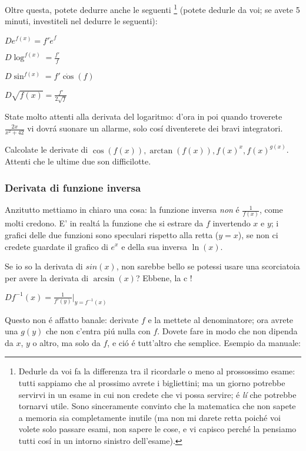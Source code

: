Oltre questa, potete dedurre anche le seguenti \footnote{Dedurle da voi fa la differenza tra il ricordarle o meno al prossossimo esame:
tutti sappiamo che al prossimo avrete i bigliettini; ma un giorno potrebbe servirvi in un esame in cui non credete che vi possa servire;
\'e {\em l\'i} che potrebbe tornarvi utile. Sono sinceramente convinto che la matematica che non sapete a memoria sia completamente inutile
(ma non mi darete retta poich\'e voi volete solo passare esami, non sapere le cose, e vi capisco perch\'e la pensiamo tutti cos\'i in un
intorno sinistro dell'esame).} (potete dedurle da voi; se avete 5 minuti, investiteli nel dedurre le seguenti):

$D e^{f(x)} = f' \dot e^f$

$D \log^{f(x)} = \frac{f'}{f} $

$D \sin^{f(x)} = f' \dot \cos(f)$

$D \sqrt{f(x)} = \frac{f'}{2\sqrt{f}}$

State molto attenti alla derivata del logaritmo: d'ora in poi quando troverete $\frac{2x}{x^2+42}$ vi
dovr\'a suonare un allarme, solo cos\'i diventerete dei bravi integratori.

\begin{esercizio}
Calcolate le derivate di $\cos(f(x)),\arctan(f(x)),f(x)^x,f(x)^{g(x)}$. Attenti che le ultime due son difficilotte.
\end{esercizio}

\subsubsection{Derivata di funzione inversa}

Anzitutto mettiamo in chiaro una cosa: la funzione inversa {\em non} \'e $\frac{1}{f(x)}$, come molti credono.
E' in realt\'a la funzione che si estrare da $f$ invertendo $x$ e $y$; i grafici delle due funzioni sono speculari rispetto alla retta ($y=x$), se non ci credete guardate il grafico di $e^x$ e della sua inversa $\ln(x)$.

Se io so la derivata di $sin(x)$, non sarebbe bello se potessi usare una scorciatoia per avere la derivata di $\arcsin(x)$? Ebbene, la c
!

$D f^{-1}(x) = \frac{1}{f'(y)} \bigg|_{y=f^{-1}(x)}$


Questo non \'e affatto banale: derivate $f$ e la mettete al denominatore; ora avrete una $g(y)$ che non c'entra pi\'u nulla con $f$. Dovete fare in modo che non dipenda da $x$, $y$ o altro, ma solo da $f$, e ci\'o \'e tutt'altro che semplice. Esempio da manuale:


